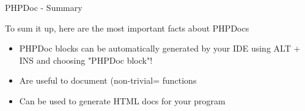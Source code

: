 \begin{frame}[fragile]{PHPDoc - Summary}
	
	To sum it up, here are the most important facts about PHPDocs\pause
	\begin{itemize}
	\item PHPDoc blocks can be automatically generated by your IDE using ALT + INS and choosing "PHPDoc block"!\pause
	\item Are useful to document (non-trivial= functions \pause
	\item Can be used to generate HTML docs for your program \pause
	\end{itemize}
\end{frame}
